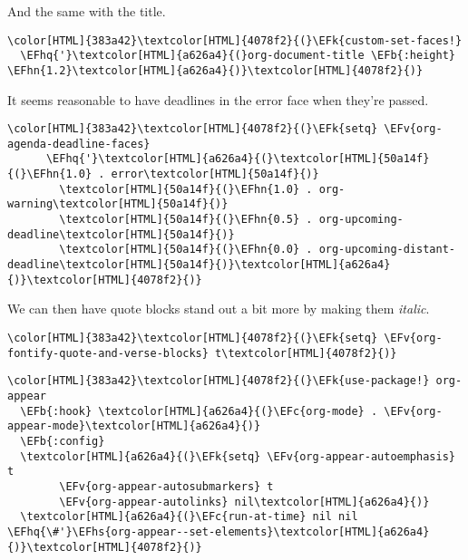 \documentclass{scrartcl}
\newcommand{\EFk}[1]{\textcolor{EFk}{#1}} %
\newcommand{\EFb}[1]{\textcolor{EFb}{#1}} %
\newcommand{\EFc}[1]{\textcolor{EFc}{#1}} %
\newcommand{\EFv}[1]{\textcolor{EFv}{#1}} %
\newcommand{\EFhn}[1]{\textcolor{EFhn}{\textbf{#1}}} %
\newcommand{\EFhq}[1]{\textcolor{EFhq}{#1}} %
\newcommand{\EFhs}[1]{\textcolor{EFhs}{#1}} %
\begin{document}
And the same with the title.
\begin{Code}
\begin{Verbatim}[]
\color[HTML]{383a42}\textcolor[HTML]{4078f2}{(}\EFk{custom-set-faces!}
  \EFhq{'}\textcolor[HTML]{a626a4}{(}org-document-title \EFb{:height} \EFhn{1.2}\textcolor[HTML]{a626a4}{)}\textcolor[HTML]{4078f2}{)}
\end{Verbatim}
\end{Code}

It seems reasonable to have deadlines in the error face when they're passed.
\begin{Code}
\begin{Verbatim}[]
\color[HTML]{383a42}\textcolor[HTML]{4078f2}{(}\EFk{setq} \EFv{org-agenda-deadline-faces}
      \EFhq{'}\textcolor[HTML]{a626a4}{(}\textcolor[HTML]{50a14f}{(}\EFhn{1.0} . error\textcolor[HTML]{50a14f}{)}
        \textcolor[HTML]{50a14f}{(}\EFhn{1.0} . org-warning\textcolor[HTML]{50a14f}{)}
        \textcolor[HTML]{50a14f}{(}\EFhn{0.5} . org-upcoming-deadline\textcolor[HTML]{50a14f}{)}
        \textcolor[HTML]{50a14f}{(}\EFhn{0.0} . org-upcoming-distant-deadline\textcolor[HTML]{50a14f}{)}\textcolor[HTML]{a626a4}{)}\textcolor[HTML]{4078f2}{)}
\end{Verbatim}
\end{Code}

We can then have quote blocks stand out a bit more by making them \emph{italic}.
\begin{Code}
\begin{Verbatim}[]
\color[HTML]{383a42}\textcolor[HTML]{4078f2}{(}\EFk{setq} \EFv{org-fontify-quote-and-verse-blocks} t\textcolor[HTML]{4078f2}{)}
\end{Verbatim}
\end{Code}

\begin{Code}
\begin{Verbatim}[]
\color[HTML]{383a42}\textcolor[HTML]{4078f2}{(}\EFk{use-package!} org-appear
  \EFb{:hook} \textcolor[HTML]{a626a4}{(}\EFc{org-mode} . \EFv{org-appear-mode}\textcolor[HTML]{a626a4}{)}
  \EFb{:config}
  \textcolor[HTML]{a626a4}{(}\EFk{setq} \EFv{org-appear-autoemphasis} t
        \EFv{org-appear-autosubmarkers} t
        \EFv{org-appear-autolinks} nil\textcolor[HTML]{a626a4}{)}
  \textcolor[HTML]{a626a4}{(}\EFc{run-at-time} nil nil \EFhq{\#'}\EFhs{org-appear--set-elements}\textcolor[HTML]{a626a4}{)}\textcolor[HTML]{4078f2}{)}
\end{Verbatim}
\end{Code}
\end{document}
